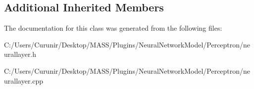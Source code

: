 \subsection*{Additional Inherited Members}


The documentation for this class was generated from the following files\+:\begin{DoxyCompactItemize}
\item 
C\+:/\+Users/\+Curunir/\+Desktop/\+M\+A\+S\+S/\+Plugins/\+Neural\+Network\+Model/\+Perceptron/neurallayer.\+h\item 
C\+:/\+Users/\+Curunir/\+Desktop/\+M\+A\+S\+S/\+Plugins/\+Neural\+Network\+Model/\+Perceptron/neurallayer.\+cpp\end{DoxyCompactItemize}
